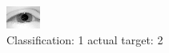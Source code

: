 \begin{figure}[h!]
\begin{center}
\includegraphics[width=0.60\columnwidth]{figures/ID2378_class_1_target_2.png}
\end{center}
\caption{ Classification: 1 actual target: 2}
\label{fig:ID2378_class_1_target_2}
\end{figure}
